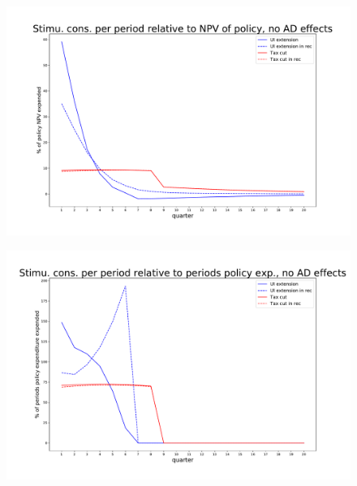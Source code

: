 \documentclass[]{article}
\begin{document}
\begin{figure}
	\centering
	\includegraphics[width=\linewidth]{../Full_Run_with_UI_Ext/NPV_Multiplier_no_AD}
	\caption{}
	\label{fig:npvmultipliernoad}
\end{figure}


\begin{figure}
	\centering
	\includegraphics[width=\linewidth]{../Full_Run_with_UI_Ext/Period_Multiplier_no_AD}
	\caption{}
	\label{fig:periodmultipliernoad}
\end{figure}


\FloatBarrier
\end{document}

